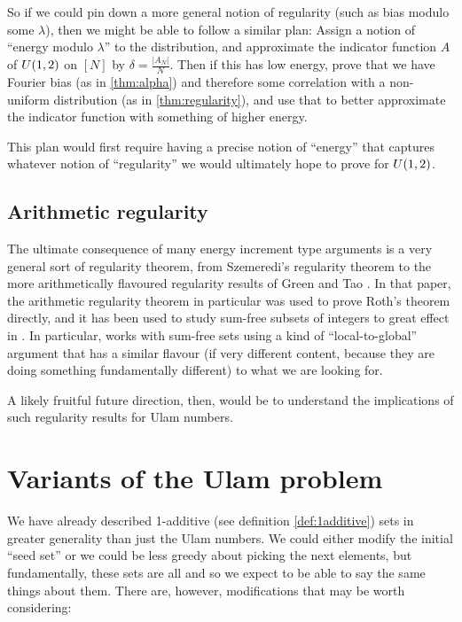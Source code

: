\documentclass{report}
\theoremstyle{remark}
\numberwithin{equation}{section}
\begin{document}
So if we could pin down a more general notion of regularity (such as
bias modulo some $\lambda$), then we might be able to follow a similar
plan: Assign a notion of ``energy modulo $\lambda$'' to the
distribution, and approximate the indicator function $A$ of
$U(1,2)$ on $[N]$ by $\delta = \frac{|A_N|}{N}$.  Then if this
has low energy, prove that we have Fourier bias (as in
\ref{thm:alpha}) and therefore some correlation with a non-uniform
distribution (as in \ref{thm:regularity}), and use that to better
approximate the indicator function with something of higher energy.

This plan would first require having a precise notion of ``energy''
that captures whatever notion of ``regularity'' we would ultimately
hope to prove for $U(1,2)$.

\subsection{Arithmetic regularity}

The ultimate consequence of many energy increment type arguments is a
very general sort of regularity theorem, from Szemeredi's regularity
theorem to the more arithmetically flavoured regularity results of
Green and Tao \cite{green:bsm2010}.  In that paper, the arithmetic
regularity theorem in particular was used to prove Roth's theorem
directly, and it has been used to study sum-free subsets of integers
to great effect in \cite{eberhard:ann2014}.  In particular,
\cite{eberhard:ann2014} works with sum-free sets using a kind of
``local-to-global'' argument that has a similar flavour (if very
different content, because they are doing something fundamentally
different) to what we are looking for.  

A likely fruitful future direction, then, would be to understand the
implications of such regularity results for Ulam numbers.  

\section{Variants of the Ulam problem}

We have already described 1-additive (see definition
\ref{def:1additive}) sets in greater generality than just the Ulam
numbers.  We could either modify the initial ``seed set'' or we could
be less greedy about picking the next elements, but fundamentally,
these sets are all \relevant and so we expect to be able to say the
same things about them.  There are, however, modifications that may be
worth considering: 
\end{document}
